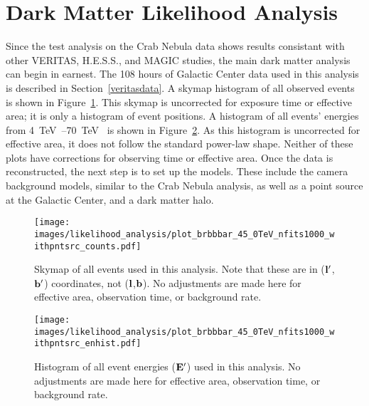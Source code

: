   \FloatBarrier

\section{Dark Matter Likelihood Analysis}\label{sec:dmlike}
  
  Since the test analysis on the Crab Nebula data shows results consistant with other VERITAS, H.E.S.S., and MAGIC studies, the main dark matter analysis can begin in earnest.
  The 108 hours of Galactic Center data used in this analysis is described in Section~\ref{veritasdata}.
  A skymap histogram of all observed events is shown in Figure~\ref{fig:gc_counts_skymap}.
  This skymap is uncorrected for exposure time or effective area; it is only a histogram of event positions.
  A histogram of all events' energies from \SIrange{4}{70}{\TeV{}} is shown in Figure~\ref{fig:gc_counts_enhist}.
  As this histogram is uncorrected for effective area, it does not follow the standard power-law shape.
  Neither of these plots have corrections for observing time or effective area.
  Once the data is reconstructed, the next step is to set up the models.
  These include the camera background models, similar to the Crab Nebula analysis, as well as a point source at the Galactic Center, and a dark matter halo.
  
  \begin{figure}[!ht]
    \centering
    \texttt{[image: images/likelihood\_analysis/plot\_brbbbar\_45\_0TeV\_nfits1000\_withpntsrc\_counts.pdf]}
    \caption[Galactic Center Counts Skymap]{
      Skymap of all events used in this analysis.
      Note that these are in ($\mathbf{l'}$,$\mathbf{b'}$) coordinates, not ($\mathbf{l }$,$\mathbf{b }$).
      No adjustments are made here for effective area, observation time, or background rate.
    }
    \label{fig:gc_counts_skymap}
  \end{figure}
  
  \begin{figure}[!ht]
    \centering
    \texttt{[image: images/likelihood\_analysis/plot\_brbbbar\_45\_0TeV\_nfits1000\_withpntsrc\_enhist.pdf]}
    \caption[Galactic Center Counts Energy Histogram]{
      Histogram of all event energies ($\mathbf{E'}$) used in this analysis.
      No adjustments are made here for effective area, observation time, or background rate.
    }
    \label{fig:gc_counts_enhist}
  \end{figure}

  \FloatBarrier

